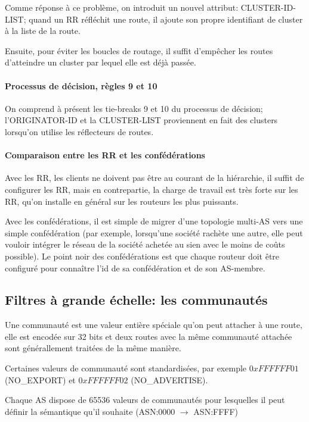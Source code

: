 \documentclass{report}
\begin{document}
Comme réponse à ce problème, on introduit un nouvel attribut:
CLUSTER-ID-LIST; quand un RR réfléchit une route, il ajoute son propre
identifiant de cluster à la liste de la route.

Ensuite, pour éviter les boucles de routage, il suffit d'empêcher les
routes d'atteindre un cluster par lequel elle est déjà passée.

\paragraph{Processus de décision, règles 9 et 10}

On comprend à présent les tie-breaks 9 et 10 du processus de décision;
l'ORIGINATOR-ID et la CLUSTER-LIST proviennent en fait des clusters
lorsqu'on utilise les réflecteurs de routes.

\paragraph{Comparaison entre les RR et les confédérations}

Avec les RR, les clients ne doivent pas être au courant de la
hiérarchie, il suffit de configurer les RR, mais en contrepartie, la
charge de travail est très forte sur les RR, qu'on installe en général
sur les routeurs les plus puissants.

Avec les confédérations, il est simple de migrer d'une topologie
multi-AS vers une simple confédération (par exemple, lorsqu'une
société rachète une autre, elle peut vouloir intégrer le réseau de la
société achetée au sien avec le moins de coûts possible). Le point
noir des confédérations est que chaque routeur doit être configuré
pour connaître l'id de sa confédération et de son AS-membre.

\subsection{Filtres à grande échelle: les communautés}

Une communauté est une valeur entière spéciale qu'on peut attacher à
une route, elle est encodée sur 32 bits et deux routes avec la même
communauté attachée sont générallement traitées de la même manière.

Certaines valeurs de communauté sont standardisées, par exemple
$0xFFFFFF01$ (NO\_EXPORT) et $0xFFFFFF02$ (NO\_ADVERTISE).

Chaque AS dispose de 65536 valeurs de communautés pour lesquelles il
peut définir la sémantique qu'il souhaite (ASN:0000 $\rightarrow$
ASN:FFFF)
\end{document}
